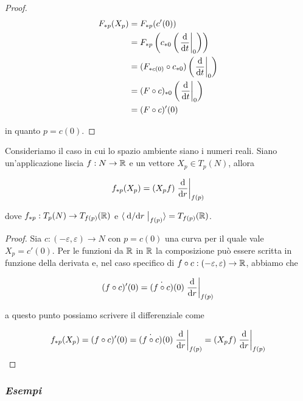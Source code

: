 \begin{proof}
	\begin{align}
		\begin{split}
			F_{*p}(X_{p}) &= F_{*p}(c'(0))\\
			&= F_{*p} \left( c_{*0} \left( \eval{ \dv{t} }_{0} \right) \right)\\
			&= (F_{*c(0)} \circ c_{*0}) \left( \eval{ \dv{t} }_{0} \right)\\
			&= (F \circ c)_{*0} \left( \eval{ \dv{t} }_{0} \right)\\
			&= (F \circ c)' (0)
		\end{split}
	\end{align}

	in quanto $ p = c(0) $.
\end{proof}

\begin{corollary}
	Consideriamo il caso in cui lo spazio ambiente siano i numeri reali. Siano un'applicazione liscia $ f : N \to \mathbb{R} $ e un vettore $ X_{p} \in T_{p}(N) $, allora
	
	\begin{equation}
		f_{*p}(X_{p}) = (X_{p} f) \eval{ \dv{r} }_{f(p)}
	\end{equation}

	dove $ f_{*p} : T_{p}(N) \to T_{f(p)}(\mathbb{R}) $ e $ \langle \eval{ \dv*{r} }_{f(p)} \rangle = T_{f(p)}(\R) $.
\end{corollary}

\begin{proof}
	Sia $ c : (-\varepsilon,\varepsilon) \to N $ con $ p = c(0) $ una curva per il quale vale $ X_{p} = c'(0) $. Per le funzioni da $ \mathbb{R} $ in $ \mathbb{R} $ la composizione può essere scritta in funzione della derivata e, nel caso specifico di $ f \circ c : (-\varepsilon,\varepsilon) \to \mathbb{R} $, abbiamo che
	
	\begin{equation}
		(f \circ c)'(0) = \dot{(f \circ c)}(0) \eval{ \dv{r} }_{f(p)}
	\end{equation}

	a questo punto possiamo scrivere il differenziale come
	
	\begin{equation}
		f_{*p}(X_{p}) = (f \circ c)' (0) %
		= \dot{(f \circ c)}(0) \eval{ \dv{r} }_{f(p)} %
		= (X_{p} f) \eval{ \dv{r} }_{f(p)}
	\end{equation}
\end{proof}

\subsubsection{\textit{Esempi}}

